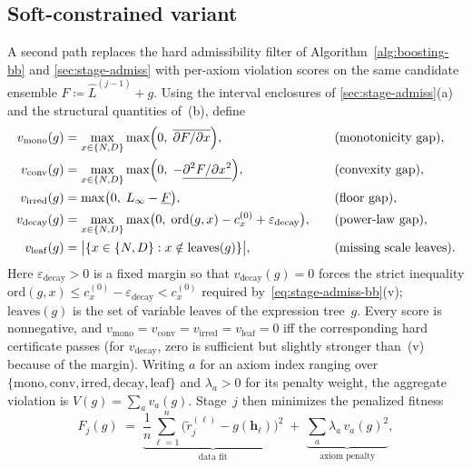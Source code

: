 \documentclass[11pt]{article}
\newcommand{\Lhat}{\hat{L}}
\begin{document}
\subsection{Soft-constrained variant}\label{sec:soft}
A second path replaces the hard admissibility filter of Algorithm~\ref{alg:boosting-bb} and \cref{sec:stage-admiss} with per-axiom violation scores on the same candidate ensemble $F \coloneqq \Lhat^{(j-1)}+g$.
Using the interval enclosures of \cref{sec:stage-admiss}(a) and the structural quantities of~(b), define
\begin{equation}\label{eq:violations-bb}
\begin{aligned}
    v_{\mathrm{mono}}(g)
      &= \max_{x\in\{N,D\}}
         \max\Bigl(0,\; \overline{\partial F/\partial x}\Bigr),
    &\quad&\text{(monotonicity gap)},
    \\
    v_{\mathrm{conv}}(g)
      &= \max_{x\in\{N,D\}}
         \max\Bigl(0,\; -\underline{\partial^2 F/\partial x^2}\Bigr),
    &\quad&\text{(convexity gap)},
    \\
    v_{\mathrm{irred}}(g)
      &= \max\bigl(0,\; L_\infty - \underline{F}\bigr),
    &\quad&\text{(floor gap)},
    \\
    v_{\mathrm{decay}}(g)
      &= \max_{x\in\{N,D\}}
         \max\bigl(0,\;
           \mathrm{ord}(g,x) - c_x^{(0)}
           + \varepsilon_{\mathrm{decay}}\bigr),
    &\quad&\text{(power-law gap)},
    \\
    v_{\mathrm{leaf}}(g)
      &= \bigl|\{x\in\{N,D\}
           : x \notin \mathrm{leaves}(g)\}\bigr|,
    &\quad&\text{(missing scale leaves)}.
\end{aligned}
\end{equation}
Here $\varepsilon_{\mathrm{decay}} > 0$ is a fixed margin so that $v_{\mathrm{decay}}(g)=0$ forces the strict inequality $\mathrm{ord}(g,x) \leq c_x^{(0)}-\varepsilon_{\mathrm{decay}} < c_x^{(0)}$ required by~\eqref{eq:stage-admiss-bb}(v); $\mathrm{leaves}(g)$ is the set of variable leaves of the expression tree~$g$.
Every score is nonnegative, and $v_{\mathrm{mono}}=v_{\mathrm{conv}}=v_{\mathrm{irred}}=v_{\mathrm{leaf}}=0$ iff the corresponding hard certificate passes (for $v_{\mathrm{decay}}$, zero is sufficient but slightly stronger than~(v) because of the margin).
Writing $a$ for an axiom index ranging over $\{\mathrm{mono},\mathrm{conv},\mathrm{irred},\mathrm{decay},\mathrm{leaf}\}$ and $\lambda_a > 0$ for its penalty weight, the aggregate violation is $V(g)=\sum_a v_a(g)$.
Stage~$j$ then minimizes the penalized fitness
\begin{equation}\label{eq:penalized-bb}
    F_j(g) \;=\;
    \underbrace{\frac{1}{n} \sum_{\ell=1}^{n}
      \bigl(\tilde{r}_j^{(\ell)} - g(\mathbf{h}_\ell)\bigr)^2}_{\text{data fit}}
    \;+\;
    \underbrace{\sum_a \lambda_a \, v_a(g)^2}_{\text{axiom penalty}} ,
\end{equation}
\end{document}
